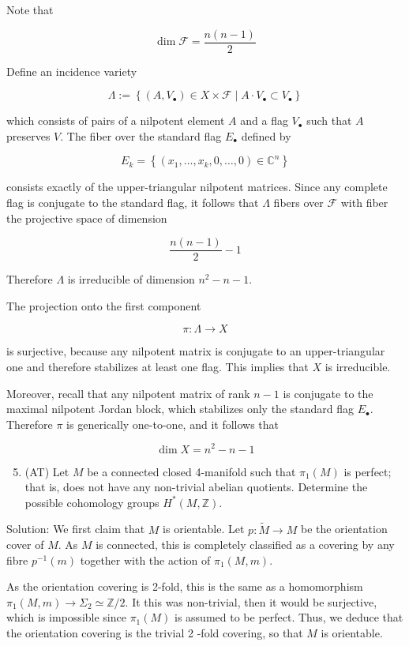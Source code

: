 \documentclass[10pt]{article}
\begin{document}
Note that

$$
\operatorname{dim} \mathcal{F}=\frac{n(n-1)}{2}
$$

Define an incidence variety

$$
\Lambda:=\left\{\left(A, V_{\bullet}\right) \in X \times \mathcal{F} \mid A \cdot V_{\bullet} \subset V_{\bullet}\right\}
$$

which consists of pairs of a nilpotent element $A$ and a flag $V_{\bullet}$ such that $A$ preserves $V$. The fiber over the standard flag $E_{\bullet}$ defined by

$$
E_{k}=\left\{\left(x_{1}, \ldots, x_{k}, 0, \ldots, 0\right) \in \mathbb{C}^{n}\right\}
$$

consists exactly of the upper-triangular nilpotent matrices. Since any complete flag is conjugate to the standard flag, it follows that $\Lambda$ fibers over $\mathcal{F}$ with fiber the projective space of dimension

$$
\frac{n(n-1)}{2}-1
$$

Therefore $\Lambda$ is irreducible of dimension $n^{2}-n-1$.

The projection onto the first component

$$
\pi: \Lambda \longrightarrow X
$$

is surjective, because any nilpotent matrix is conjugate to an upper-triangular one and therefore stabilizes at least one flag. This implies that $X$ is irreducible.

Moreover, recall that any nilpotent matrix of rank $n-1$ is conjugate to the maximal nilpotent Jordan block, which stabilizes only the standard flag $E_{\bullet}$. Therefore $\pi$ is generically one-to-one, and it follows that

$$
\operatorname{dim} X=n^{2}-n-1
$$

\begin{enumerate}
  \setcounter{enumi}{4}
  \item (AT) Let $M$ be a connected closed 4-manifold such that $\pi_{1}(M)$ is perfect; that is, does not have any non-trivial abelian quotients. Determine the possible cohomology groups $H^{*}(M, \mathbb{Z})$.
\end{enumerate}

Solution: We first claim that $M$ is orientable. Let $p: \widetilde{M} \rightarrow M$ be the orientation cover of $M$. As $M$ is connected, this is completely classified as a covering by any fibre $p^{-1}(m)$ together with the action of $\pi_{1}(M, m)$.

As the orientation covering is 2-fold, this is the same as a homomorphism $\pi_{1}(M, m) \rightarrow \Sigma_{2} \simeq \mathbb{Z} / 2$. It this was non-trivial, then it would be surjective, which is impossible since $\pi_{1}(M)$ is assumed to be perfect. Thus, we deduce that the orientation covering is the trivial 2 -fold covering, so that $M$ is orientable.
\end{document}
